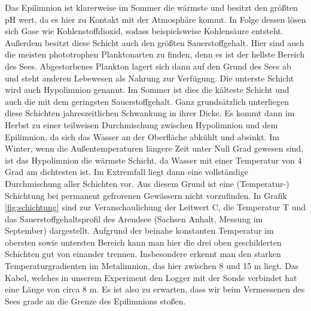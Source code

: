 \documentclass[12pt,a4paper,titlepage,headinclude,bibtotoc]{scrartcl}
\numberwithin{equation}{subsection}
\begin{document}
Das Epilimnion ist klarerweise im Sommer die wärmste und besitzt den größten pH wert, da es hier zu Kontakt mit der Atmosphäre kommt.
In Folge dessen lösen sich Gase wie Kohlenstoffdioxid, sodass beispielsweise Kohlensäure entsteht.
Außerdem besitzt diese Schicht auch den größten Sauerstoffgehalt.
Hier sind auch die meisten phototrophen Planktonarten zu finden, denn es ist der hellste Bereich des Sees.
Abgestorbenes Plankton lagert sich dann auf den Grund des Sees ab und steht anderen Lebewesen als Nahrung zur Verfügung.
\newline
Die unterste Schicht wird auch Hypolimnion genannt.
Im Sommer ist dies die kälteste Schicht und auch die mit dem geringsten Sauerstoffgehalt. 
Ganz grundsätzlich unterliegen diese Schichten jahreszeitlichen Schwankung in ihrer Dicke.
Es kommt dann im Herbst zu einer teilweisen Durchmischung zwischen Hypolimnion und dem Epilimnion, da sich das Wasser an der Oberfläche abkühlt und absinkt.
Im Winter, wenn die Außentemperaturen längere Zeit unter Null Grad gewesen sind, ist das Hypolimnion die wärmste Schicht, da Wasser mit einer Temperatur von 4 Grad am dichtesten ist. 
Im Extremfall liegt dann eine vollständige Durchmischung aller Schichten vor.
Aus diesem Grund ist eine (Temperatur-) Schichtung bei permanent gefrorenen Gewässern nicht vorzufinden.
\newline
In Grafik \ref{fig:schichtung} sind zur Veranschaulichung der Leitwert C, die Temperatur T und das Sauerstoffgehaltsprofil des Arendsee (Sachsen Anhalt, Messung im September) dargestellt. 
Aufgrund der beinahe konstanten Temperatur im obersten sowie untersten Bereich kann man hier die drei oben geschilderten Schichten gut von einander trennen.
Insbesondere erkennt man den starken Temperaturgradienten im Metalimnion, das hier zwischen 8 und 15 m liegt. 
Das Kabel, welches in unserem Experiment den Logger mit der Sonde verbindet hat eine Länge von circa 8 m.
Es ist also zu erwarten, dass wir beim Vermessenen des Sees grade an die Grenze des Epilimnions stoßen.
\cite{schicht}
\end{document}
